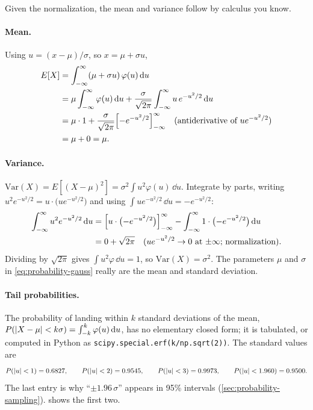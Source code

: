Given the normalization, the mean and variance follow by calculus you know.

\paragraph{Mean.} Using $u=(x-\mu)/\sigma$, so $x=\mu+\sigma u$,
\begin{align*}
E[X] &= \int_{-\infty}^{\infty}(\mu+\sigma u)\,\varphi(u)\,\mathrm{d} u\\
&= \mu\int_{-\infty}^{\infty}\varphi(u)\,\mathrm{d} u + \frac{\sigma}{\sqrt{2\pi}}\int_{-\infty}^{\infty}u\,e^{-u^2/2}\,\mathrm{d} u\\
&= \mu\cdot1 + \frac{\sigma}{\sqrt{2\pi}}\Bigl[-e^{-u^2/2}\Bigr]_{-\infty}^{\infty} \quad\text{(antiderivative of $ue^{-u^2/2}$)}\\
&= \mu + 0 = \mu .
\end{align*}

\paragraph{Variance.} $\mathrm{Var}(X)=E[(X-\mu)^2]=\sigma^2\int u^2\varphi(u)\,\dd u$. Integrate by parts, writing $u^2e^{-u^2/2}=u\cdot\bigl(ue^{-u^2/2}\bigr)$ and using $\int ue^{-u^2/2}\,\dd u=-e^{-u^2/2}$:
\begin{align*}
\int_{-\infty}^{\infty}u^2e^{-u^2/2}\,\mathrm{d} u &= \Bigl[u\cdot\bigl(-e^{-u^2/2}\bigr)\Bigr]_{-\infty}^{\infty} - \int_{-\infty}^{\infty}1\cdot\bigl(-e^{-u^2/2}\bigr)\,\mathrm{d} u\\
&= 0 + \sqrt{2\pi} \quad\text{($ue^{-u^2/2}\to0$ at $\pm\infty$; normalization)}.
\end{align*}
Dividing by $\sqrt{2\pi}$ gives $\int u^2\varphi\,\dd u=1$, so $\mathrm{Var}(X)=\sigma^2$. The parameters $\mu$ and $\sigma$ in \cref{eq:probability-gauss} really are the mean and standard deviation.

\paragraph{Tail probabilities.} The probability of landing within $k$ standard deviations of the mean, $P(\left\lvert X-\mu\right\rvert<k\sigma)=\int_{-k}^{k}\varphi(u)\,\mathrm{d} u$, has no elementary closed form; it is tabulated, or computed in Python as \texttt{scipy.special.erf(k/np.sqrt(2))}. The standard values are
\begin{equation}
P(\left\lvert u\right\rvert<1)=0.6827,\qquad P(\left\lvert u\right\rvert<2)=0.9545,\qquad P(\left\lvert u\right\rvert<3)=0.9973,\qquad P(\left\lvert u\right\rvert<1.960)=0.9500 .
\label{eq:probability-gauss-table}
\end{equation}
The last entry is why ``$\pm1.96\,\sigma$'' appears in 95\% intervals (\cref{sec:probability-sampling}).  shows the first two.

